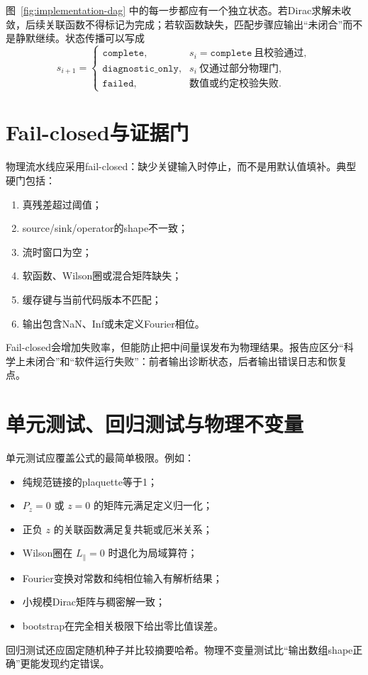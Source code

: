 \documentclass[UTF8,12pt,a4paper,twoside,openany]{ctexbook}
\begin{document}
图~\ref{fig:implementation-dag} 中的每一步都应有一个独立状态。若Dirac求解未收敛，后续关联函数不得标记为完成；若软函数缺失，匹配步骤应输出“未闭合”而不是静默继续。状态传播可以写成
\begin{equation}
  s_{i+1}=
  \begin{cases}
    \texttt{complete},&s_i=\texttt{complete}\ \text{且校验通过},\\
    \texttt{diagnostic\_only},&s_i\ \text{仅通过部分物理门},\\
    \texttt{failed},&\text{数值或约定校验失败}.
  \end{cases}
  \label{eq:state-propagation}
\end{equation}

\section{Fail-closed与证据门}

物理流水线应采用fail-closed：缺少关键输入时停止，而不是用默认值填补。典型硬门包括：
\begin{enumerate}
  \item 真残差超过阈值；
  \item source/sink/operator的shape不一致；
  \item 流时窗口为空；
  \item 软函数、Wilson圈或混合矩阵缺失；
  \item 缓存键与当前代码版本不匹配；
  \item 输出包含NaN、Inf或未定义Fourier相位。
\end{enumerate}
Fail-closed会增加失败率，但能防止把中间量误发布为物理结果。报告应区分“科学上未闭合”和“软件运行失败”：前者输出诊断状态，后者输出错误日志和恢复点。

\section{单元测试、回归测试与物理不变量}

单元测试应覆盖公式的最简单极限。例如：
\begin{itemize}
  \item 纯规范链接的plaquette等于1；
  \item \(P_z=0\) 或 \(z=0\) 的矩阵元满足定义归一化；
  \item 正负 \(z\) 的关联函数满足复共轭或厄米关系；
  \item Wilson圈在 \(L_\parallel=0\) 时退化为局域算符；
  \item Fourier变换对常数和纯相位输入有解析结果；
  \item 小规模Dirac矩阵与稠密解一致；
  \item bootstrap在完全相关极限下给出零比值误差。
\end{itemize}
回归测试还应固定随机种子并比较摘要哈希。物理不变量测试比“输出数组shape正确”更能发现约定错误。
\end{document}
